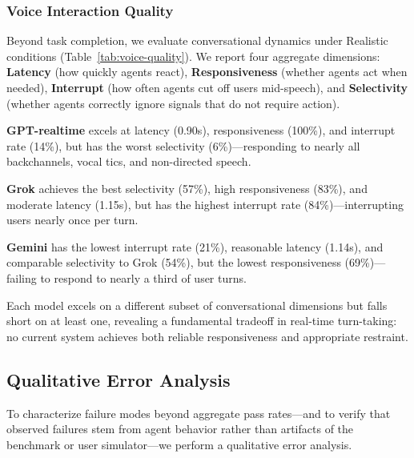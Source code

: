 \subsubsection{Voice Interaction Quality}

Beyond task completion, we evaluate conversational dynamics under Realistic conditions (Table~\ref{tab:voice-quality}). We report four aggregate dimensions: \textbf{Latency} (how quickly agents react), \textbf{Responsiveness} (whether agents act when needed), \textbf{Interrupt} (how often agents cut off users mid-speech), and \textbf{Selectivity} (whether agents correctly ignore signals that do not require action).

\begin{table}[h]
\caption{Voice interaction quality (Realistic condition, aggregated across domains). \textbf{Bold} indicates best. Full breakdown in Appendix~\ref{app:voice-metrics-detail}.}
\label{tab:voice-quality}
\centering
\begin{small}
\resizebox{\columnwidth}{!}{%

}
\end{small}
\end{table}



\textbf{GPT-realtime} excels at latency (0.90s), responsiveness (100\%), and interrupt rate (14\%), but has the worst selectivity (6\%)---responding to nearly all backchannels, vocal tics, and non-directed speech.

\textbf{Grok} achieves the best selectivity (57\%), high responsiveness (83\%), and moderate latency (1.15s), but has the highest interrupt rate (84\%)---interrupting users nearly once per turn.

\textbf{Gemini} has the lowest interrupt rate (21\%), reasonable latency (1.14s), and comparable selectivity to Grok (54\%), but the lowest responsiveness (69\%)---failing to respond to nearly a third of user turns.

Each model excels on a different subset of conversational dimensions but falls short on at least one, revealing a fundamental tradeoff in real-time turn-taking: no current system achieves both reliable responsiveness and appropriate restraint.

\subsection{Qualitative Error Analysis}
\label{sec:analysis}

To characterize failure modes beyond aggregate pass rates---and to verify that observed failures stem from agent behavior rather than artifacts of the benchmark or user simulator---we perform a qualitative error analysis.

